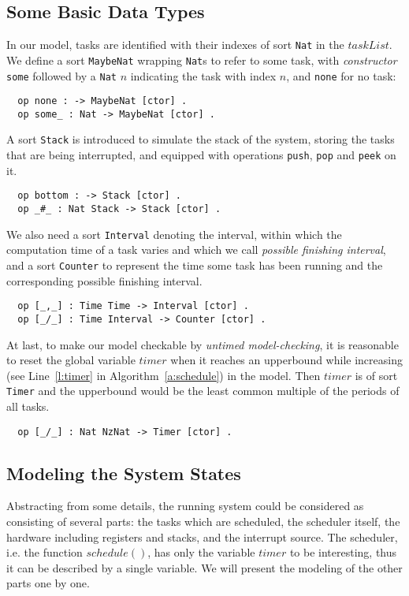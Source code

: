 \documentclass{llncs}
\begin{document}
\subsection{Some Basic Data Types}
In our model, tasks are identified with their indexes of sort
\verb|Nat| in the $taskList$. We define a sort \verb|MaybeNat|
wrapping \verb|Nat|s to refer to some task, with \emph{constructor}
\verb|some| followed by a \verb|Nat| $n$ indicating the task with
index $n$, and \verb|none| for no task:
\begin{verbatim}
  op none : -> MaybeNat [ctor] .
  op some_ : Nat -> MaybeNat [ctor] .
\end{verbatim}

A sort \verb|Stack| is introduced to simulate the stack of the system,
storing the tasks that are being interrupted, and equipped with
operations \verb|push|, \verb|pop| and \verb|peek| on it.
\begin{verbatim}
  op bottom : -> Stack [ctor] .
  op _#_ : Nat Stack -> Stack [ctor] .
\end{verbatim}

We also need a sort \verb|Interval| denoting the interval, within
which the computation time of a task varies and which we call
\emph{possible finishing interval}, and a sort \verb|Counter| to
represent the time some task has been running and the corresponding
possible finishing interval.
\begin{verbatim}
  op [_,_] : Time Time -> Interval [ctor] .
  op [_/_] : Time Interval -> Counter [ctor] .
\end{verbatim}

At last, to make our model checkable by \emph{untimed model-checking},
it is reasonable to reset the global variable $timer$ when it reaches
an upperbound while increasing (see Line~\ref{l:timer} in
Algorithm~\ref{a:schedule}) in the model. Then $timer$ is of sort
\verb|Timer| and the upperbound would be the least common multiple of
the periods of all tasks.
\begin{verbatim}
  op [_/_] : Nat NzNat -> Timer [ctor] .
\end{verbatim}

\subsection{Modeling the System States}
Abstracting from some details, the running system could be considered
as consisting of several parts: the tasks which are scheduled, the
scheduler itself, the hardware including registers and stacks, and the
interrupt source. The scheduler, i.e. the function $schedule()$, has
only the variable $timer$ to be interesting, thus it can be described
by a single variable. We will present the modeling of the other parts
one by one.
\end{document}
